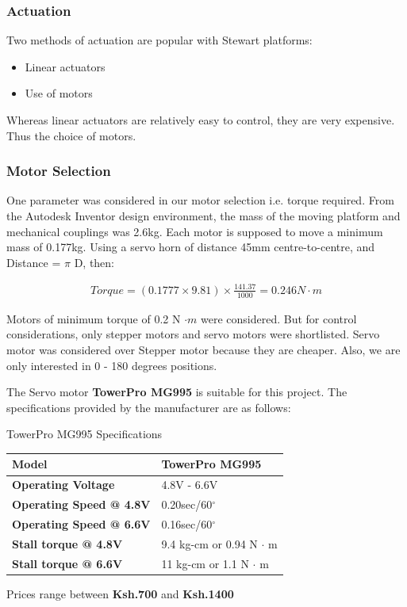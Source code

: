 \subsubsection{Actuation}
Two methods of actuation are popular with Stewart platforms:
\begin{itemize}
\item Linear actuators
\item Use of motors
\end{itemize}
Whereas linear actuators are relatively easy to control, they are very expensive. Thus the choice of motors.

\subsubsection*{Motor Selection}
One parameter was considered in our motor selection i.e. torque required. From the Autodesk Inventor design environment, the mass of the moving platform and mechanical couplings was 2.6kg. Each motor is supposed to move a minimum mass of 0.177kg. Using a servo horn of distance 45mm centre-to-centre, and Distance = $ \pi $ D, then:
\begin{ceqn}
\begin{align}
	Torque = (0.1777 \times 9.81)\times \frac{141.37}{1000} = 0.246 N\cdot m
\end{align}
\end{ceqn}
Motors of minimum torque of 0.2 N $\cdot m$ were considered. But for control considerations, only stepper motors and servo motors were shortlisted. Servo motor was considered over Stepper motor because they are cheaper. Also, we are only interested in 0 - 180 degrees positions.

The Servo motor \textbf{TowerPro MG995} is suitable for this project. The specifications provided by the manufacturer are as follows:

\begin{table}[!h]
\caption[Motor Specifications]{TowerPro MG995 Specifications}
\end{table}
\begin{center}
\begin{tabular}{|l|l|}
\hline
\textbf{Model}& TowerPro MG995\\
\hline
\textbf{Operating Voltage} & 4.8V - 6.6V\\
\hline
\textbf{Operating Speed @ 4.8V} & 0.20sec/60$^{\circ}$\\
\hline
\textbf{Operating Speed @ 6.6V}& 0.16sec/60$^{\circ}$\\
\hline
\textbf{Stall torque @ 4.8V} & 9.4 kg-cm or 0.94 N $\cdot$ m\\
\hline
\textbf{Stall torque @ 6.6V} & 11 kg-cm or 1.1 N $\cdot$ m\\
\hline
\end{tabular}
\end{center}
Prices range between \textbf{Ksh.700} and \textbf{Ksh.1400}

